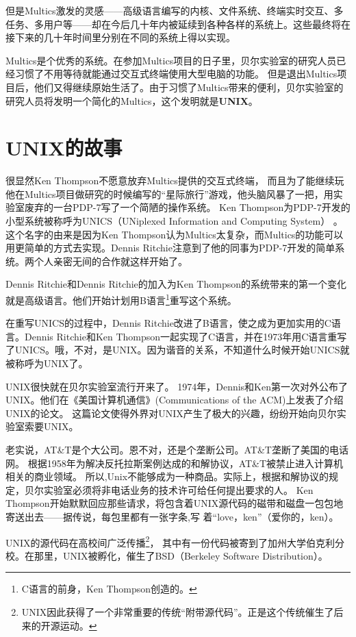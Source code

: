 但是Multics激发的灵感------高级语言编写的内核、文件系统、终端实时交互、多任务、多用户等------却在今后几十年内被延续到各种各样的系统上。这些最终将在接下来的几十年时间里分别在不同的系统上得以实现。

Multics是个优秀的系统。在参加Multics项目的日子里，贝尔实验室的研究人员已经习惯了不用等待就能通过交互式终端使用大型电脑的功能。
但是退出Multics项目后，他们又得继续原始生活了。由于习惯了Multics带来的便利，贝尔实验室的研究人员将发明一个简化的Multics，这个发明就是\textbf{UNIX}。

\section{UNIX的故事}

很显然Ken Thompson不愿意放弃Multics提供的交互式终端，
而且为了能继续玩他在Multics项目做研究的时候编写的“星际旅行”游戏，他头脑风暴了一把，用实验室废弃的一台PDP-7写了一个简陋的操作系统。
Ken Thompson为PDP-7开发的小型系统被称呼为UNICS（UNiplexed Information and Computing System） 。 这个名字的由来是因为Ken Thompson认为Multics太复杂，而Multics的功能可以用更简单的方式去实现。Dennis Ritchie注意到了他的同事为PDP-7开发的简单系统。两个人亲密无间的合作就这样开始了。


Dennis Ritchie和Dennis Ritchie的加入为Ken Thompson的系统带来的第一个变化就是高级语言。他们开始计划用B语言\footnote{C语言的前身，Ken Thompson创造的。}重写这个系统。

在重写UNICS的过程中，Dennis Ritchie改进了B语言，使之成为更加实用的C语言。Dennis Ritchie和Ken Thompson一起实现了C语言，并在1973年用C语言重写了UNICS。哦，不对，是UNIX。因为谐音的关系，不知道什么时候开始UNICS就被称呼为UNIX了。

UNIX很快就在贝尔实验室流行开来了。
1974年，Dennis和Ken第一次对外公布了UNIX。他们在《美国计算机通信》(Communications of the ACM)上发表了介绍UNIX的论文。
这篇论文使得外界对UNIX产生了极大的兴趣，纷纷开始向贝尔实验室索要UNIX。

老实说，AT\&T是个大公司。恩不对，还是个垄断公司。AT\&T垄断了美国的电话网。
根据1958年为解决反托拉斯案例达成的和解协议，AT\&T被禁止进入计算机相关的商业领域。
所以,Unix不能够成为一种商品。实际上，根据和解协议的规定，贝尔实验室必须将非电话业务的技术许可给任何提出要求的人。
Ken Thompson开始默默回应那些请求，将包含着UNIX源代码的磁带和磁盘一包包地寄送出去——据传说，每包里都有一张字条,写
着“love，ken”（爱你的，ken）。

UNIX的源代码在高校间广泛传播\footnote{UNIX因此获得了一个非常重要的传统“附带源代码”。正是这个传统催生了后来的开源运动。}，
其中有一份代码被寄到了加州大学伯克利分校。在那里，UNIX被孵化，催生了BSD（Berkeley Software Distribution）。

